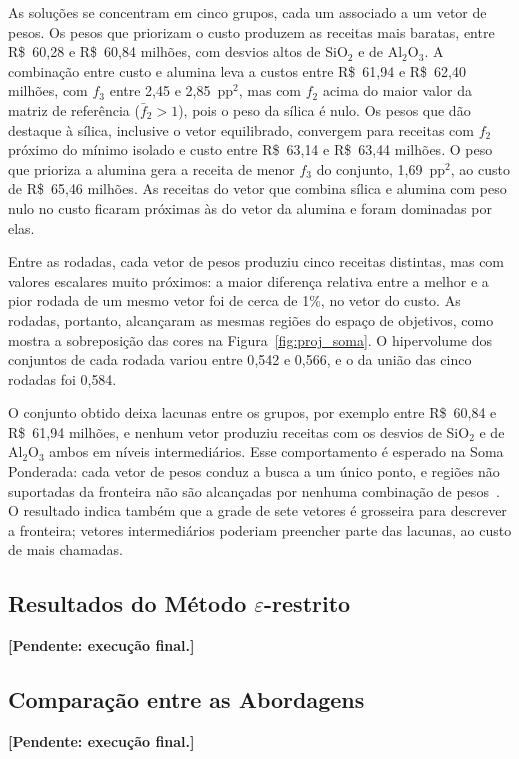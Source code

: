 \documentclass[conference]{IEEEtran}
\begin{document}
As soluções se concentram em cinco grupos, cada um associado a um vetor de pesos. Os pesos que priorizam o custo produzem as receitas mais baratas, entre R\$~60{,}28 e R\$~60{,}84 milhões, com desvios altos de SiO$_2$ e de Al$_2$O$_3$. A combinação entre custo e alumina leva a custos entre R\$~61{,}94 e R\$~62{,}40 milhões, com $f_3$ entre 2{,}45 e 2{,}85~pp$^2$, mas com $f_2$ acima do maior valor da matriz de referência ($\bar f_2>1$), pois o peso da sílica é nulo. Os pesos que dão destaque à sílica, inclusive o vetor equilibrado, convergem para receitas com $f_2$ próximo do mínimo isolado e custo entre R\$~63{,}14 e R\$~63{,}44 milhões. O peso que prioriza a alumina gera a receita de menor $f_3$ do conjunto, 1{,}69~pp$^2$, ao custo de R\$~65{,}46 milhões. As receitas do vetor que combina sílica e alumina com peso nulo no custo ficaram próximas às do vetor da alumina e foram dominadas por elas.

Entre as rodadas, cada vetor de pesos produziu cinco receitas distintas, mas com valores escalares muito próximos: a maior diferença relativa entre a melhor e a pior rodada de um mesmo vetor foi de cerca de 1\%, no vetor do custo. As rodadas, portanto, alcançaram as mesmas regiões do espaço de objetivos, como mostra a sobreposição das cores na Figura~\ref{fig:proj_soma}. O hipervolume dos conjuntos de cada rodada variou entre 0{,}542 e 0{,}566, e o da união das cinco rodadas foi 0{,}584.

O conjunto obtido deixa lacunas entre os grupos, por exemplo entre R\$~60{,}84 e R\$~61{,}94 milhões, e nenhum vetor produziu receitas com os desvios de SiO$_2$ e de Al$_2$O$_3$ ambos em níveis intermediários. Esse comportamento é esperado na Soma Ponderada: cada vetor de pesos conduz a busca a um único ponto, e regiões não suportadas da fronteira não são alcançadas por nenhuma combinação de pesos~\cite{blank_deb2020}. O resultado indica também que a grade de sete vetores é grosseira para descrever a fronteira; vetores intermediários poderiam preencher parte das lacunas, ao custo de mais chamadas.

\subsection{Resultados do Método $\varepsilon$-restrito}
\textbf{[Pendente: execução final.]}

\subsection{Comparação entre as Abordagens}
\textbf{[Pendente: execução final.]}
\end{document}
